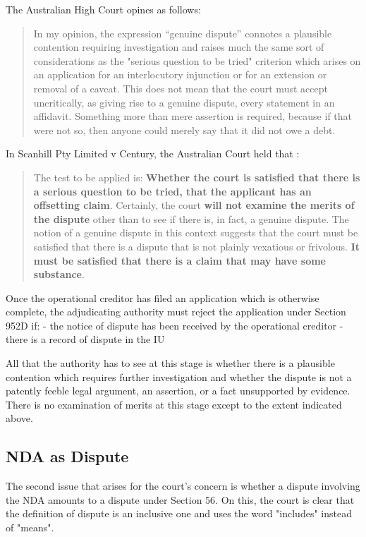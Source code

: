 \documentclass[12pt]{article}
\begin{document}
The Australian High Court opines as follows:
\begin{quote}
  In my opinion, the expression ``genuine dispute'' connotes a plausible contention requiring investigation and raises much the same sort of considerations as the "serious question to be tried" criterion which arises on an application for an interlocutory injunction or for an extension or removal of a caveat.
  This does not mean that the court must accept uncritically, as giving rise to a genuine dispute, every statement in an affidavit.
  Something more than mere assertion is required, because if that were not so, then anyone could merely say that it did not owe a debt.
\end{quote}

In Scanhill Pty Limited v Century, the Australian Court held that :

\begin{quote}
  The test to be applied is: \textbf{Whether the court is satisfied that there is a serious question to be tried, that the applicant has an offsetting claim}. Certainly, the court \textbf{will not examine the merits of the dispute} other than to see if there is, in fact, a genuine dispute.
  The notion of a genuine dispute in this context suggests that the court must be satisfied that there is a dispute that is not plainly vexatious or frivolous. \textbf{It must be satisfied that there is a claim that may have some substance}.
\end{quote}

Once the operational creditor has filed an application which is otherwise complete, the adjudicating authority must reject the application under Section 952D if:
- the notice of dispute has been received by the operational creditor
- there is a record of dispute in the IU


All that the authority has to see at this stage is whether there is a plausible contention which requires further investigation and whether the dispute is not a patently feeble legal argument, an assertion, or a fact unsupported by evidence. There is no examination of merits at this stage except to the extent indicated above.


\subsection*{NDA as Dispute}

The second issue that arises for the court's concern is whether a dispute involving the NDA amounts to a dispute under Section 56. On this, the court is clear that the definition of dispute is an inclusive one and uses the word "includes" instead of "means".
\end{document}
